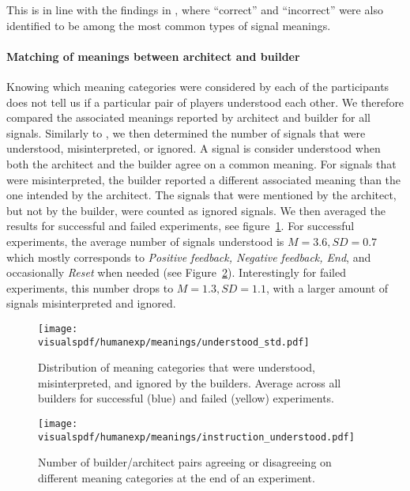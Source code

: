 This is in line with the findings in \cite{griffiths2012bottom}, where ``correct'' and ``incorrect'' were also identified to be among the most common types of signal meanings.

\paragraph{Matching of meanings between architect and builder} 

Knowing which meaning categories were considered by each of the participants does not tell us if a particular pair of players understood each other. We therefore compared the associated meanings reported by architect and builder for all signals. Similarly to \cite{griffiths2012bottom}, we then determined the number of signals that were understood, misinterpreted, or ignored. A signal is consider understood when both the architect and the builder agree on a common meaning. For signals that were misinterpreted, the builder reported a different associated meaning than the one intended by the architect. The signals that were mentioned by the architect, but not by the builder, were counted as ignored signals. We then averaged the results for successful and failed experiments, see figure~\ref{fig:types_of_understanding}. For successful experiments, the average number of signals understood is $M = 3.6, SD = 0.7$ which mostly corresponds to \emph{Positive feedback, Negative feedback, End}, and occasionally \emph{Reset} when needed (see Figure~\ref{fig:understanding_per_feedback}). Interestingly for failed experiments, this number drops to $M = 1.3, SD = 1.1$, with a larger amount of signals misinterpreted and ignored.

\begin{figure}[!htbp]
    \begin{center}
      \texttt{[image: \\visualspdf/humanexp/meanings/understood\_std.pdf]}
        \caption{Distribution of meaning categories that were understood, misinterpreted, and ignored by the builders. Average across all builders for successful (blue) and failed (yellow) experiments.}
      \label{fig:types_of_understanding}
    \end{center}
\end{figure}

\begin{figure}[!htbp]
  \begin{center}
      \texttt{[image: \\visualspdf/humanexp/meanings/instruction\_understood.pdf]}
      \caption{Number of builder/architect pairs agreeing or disagreeing on different meaning categories at the end of an experiment.}
    \label{fig:understanding_per_feedback}
    \end{center}
\end{figure}

